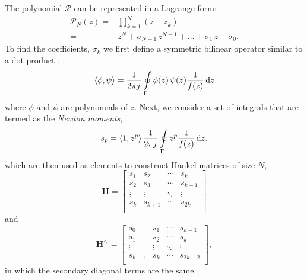 The polynomial $\mathcal P$ can be represented in a Lagrange form:
%
\begin{equation}
  \begin{split}
    \mathcal{P}_N(z) ={}& \prod \limits_{k = 1}^N \left(z - z_k \right) \\
    ={}& z^N + \sigma_{N-1} \, z^{N-1} + \dots + \sigma_{1} \, z + \sigma_0.
  \end{split}
  \label{eq:poly}%
\end{equation}
%
To find the coefficients, $\sigma_k$ we first define a symmetric bilinear operator similar to a dot product \cite{Kravanja1999,Gillan2006c},
%
\begin{equation}
  \left \langle \phi, \psi \right \rangle = \frac{1}{2 \pi {j}\mkern1mu} \oint \limits_{\Gamma} \phi(z) \, \psi(z) \frac{1}{f(z)} \mathop{}\!\mathrm{d}{z}
  \label{eq:blinear}
\end{equation}
%
where $\phi$ and $\psi$ are polynomials of $z$. Next, we consider a set of integrals that are termed as the \emph{Newton moments},
%
\begin{equation}
  s_p = \left \langle 1, z^p \right \rangle \frac{1}{2 \pi {j}\mkern1mu} \oint \limits_{\Gamma} z^p \frac{1}{f(z)} \mathop{}\!\mathrm{d}{z}.
  \label{eq:s_p}
\end{equation}
%
which are then used as elements to construct Hankel matrices of size $N$,
%
\begin{equation}
  \mathbf H =
  \begin{bmatrix}
    s_1 & s_2 & \cdots & s_k \\
    s_2 & s_3 & \cdots & s_{k+1} \\
    \vdots & \vdots & \ddots & \vdots \\
    s_k & s_{k+1} & \cdots & s_{2k} \\
  \end{bmatrix}
  \label{eq:Hmat}
\end{equation}
%
and
%
\begin{equation}
  \mathbf H^< =
  \begin{bmatrix}
    s_0 & s_1 & \cdots & s_{k-1} \\
    s_1 & s_2 & \cdots & s_{k} \\
    \vdots & \vdots & \ddots & \vdots \\
    s_{k-1} & s_{k} & \cdots & s_{2k-2} \\
  \end{bmatrix},
  \label{eq:Hmat<}
\end{equation}
%
in which the secondary diagonal terms are the same.

